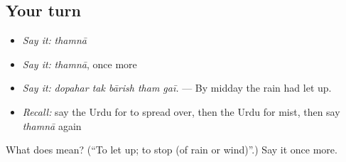 \subsection*{Your turn}
\begin{itemize}
\raggedright
  \item \emph{Say it:} \emph{thamnā}
  \item \emph{Say it:} \emph{thamnā}, once more
  \item \emph{Say it:} \emph{dopahar tak bārish tham gaī.} — By midday the rain had let up.
  \item \emph{Recall:} say the Urdu for to spread over, then the Urdu for mist, then say \emph{thamnā} again
\end{itemize}

\begin{tcolorbox}[breakable,colback=teal!4,colframe=teal!35!black,title={Before you move on}]
What does  mean? (\textquotedblleft{}To let up; to stop (of rain or wind)\textquotedblright{}.) Say it once more.
\end{tcolorbox}
